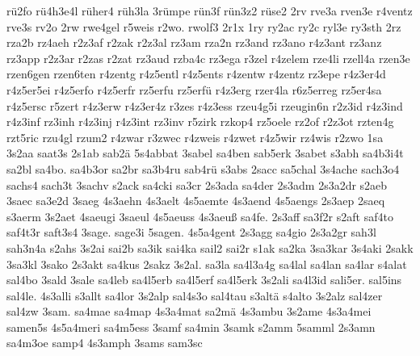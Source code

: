 {    rü2fo
    rü4h3e4l
    rüher4
    rüh3la
    3rümpe
    rün3f
    rün3z2
    rüse2
    2rv
    rve3a
    rven3e
    r4ventz
    rve3s
    rv2o
    2rw
    rwe4gel
    r5weis
    r2wo.
    rwolf3
    2r1x
    1ry
    ry2ac
    ry2c
    ryl3e
    ry3sth
    2rz
    rza2b
    rz4aeh
    r2z3af
    r2zak
    r2z3al
    rz3am
    rza2n
    rz3and
    rz3ano
    r4z3ant
    rz3anz
    rz3app
    r2z3ar
    r2zas
    r2zat
    rz3aud
    rzba4c
    rz3ega
    r3zel
    r4zelem
    rze4li
    rzell4a
    rzen3e
    rzen6gen
    rzen6ten
    r4zentg
    r4z5entl
    r4z5ents
    r4zentw
    r4zentz
    rz3epe
    r4z3er4d
    r4z5er5ei
    r4z5erfo
    r4z5erfr
    rz5erfu
    rz5erfü
    r4z3erg
    rzer4la
    r6z5erreg
    rz5er4sa
    r4z5ersc
    r5zert
    r4z3erw
    r4z3er4z
    r3zes
    r4z3ess
    rzeu4g5i
    rzeugin6n
    r2z3id
    r4z3ind
    r4z3inf
    rz3inh
    r4z3inj
    r4z3int
    rz3inv
    r5zirk
    rzkop4
    rz5oele
    rz2of
    r2z3ot
    rzten4g
    rzt5ric
    rzu4gl
    rzum2
    r4zwar
    r3zwec
    r4zweis
    r4zwet
    r4z5wir
    rz4wis
    r2zwo
    1sa
    3s2aa
    saat3s
    2s1ab
    sab2ä
    5s4abbat
    3sabel
    sa4ben
    sab5erk
    3sabet
    s3abh
    sa4b3i4t
    sa2bl
    sa4bo.
    sa4b3or
    sa2br
    sa3b4ru
    sab4rü
    s3abs
    2sacc
    sa5chal
    3s4ache
    sach3o4
    sachs4
    sach3t
    3sachv
    s2ack
    sa4cki
    sa3cr
    2s3ada
    sa4der
    2s3adm
    2s3a2dr
    s2aeb
    3saec
    sa3e2d
    3saeg
    4s3aehn
    4s3aelt
    4s5aemte
    4s3aend
    4s5aengs
    2s3aep
    2saeq
    s3aerm
    3s2aet
    4saeugi
    3saeul
    4s5aeuss
    4s3aeuß
    sa4fe.
    2s3aff
    sa3f2r
    s2aft
    saf4to
    saf4t3r
    saft3s4
    3sage.
    sage3i
    5sagen.
    4s5a4gent
    2s3agg
    sa4gio
    2s3a2gr
    sah3l
    sah3n4a
    s2ahs
    3s2ai
    sai2b
    sa3ik
    sai4ka
    sail2
    sai2r
    s1ak
    sa2ka
    3sa3kar
    3s4aki
    2sakk
    3sa3kl
    3sako
    2s3akt
    sa4kus
    2sakz
    3s2al.
    sa3la
    sa4l3a4g
    sa4lal
    sa4lan
    sa4lar
    s4alat
    sal4bo
    3sald
    3sale
    sa4leb
    sa4l5erb
    sa4l5erf
    sa4l5erk
    3s2ali
    sa4l3id
    sali5er.
    sal5ins
    sal4le.
    4s3alli
    s3allt
    sa4lor
    3s2alp
    sal4s3o
    sal4tau
    s3altä
    s4alto
    3s2alz
    sal4zer
    sal4zw
    3sam.
    sa4mae
    sa4map
    4s3a4mat
    sa2mä
    4s3ambu
    3s2ame
    4s3a4mei
    samen5s
    4s5a4meri
    sa4m5ess
    3samf
    sa4min
    3samk
    s2amm
    5samml
    2s3amn
    sa4m3oe
    samp4
    4s3amph
    3sams
    sam3sc
}
